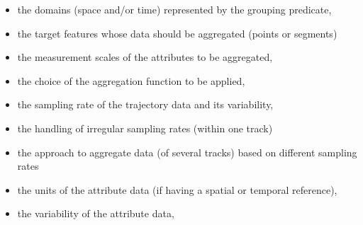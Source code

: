 \documentclass[12pt, oneside, a4paper]{scrbook}
\begin{document}
\begin{itemize}
\item the domains (space and/or time) represented by the grouping predicate, %
\item the target features whose data should be aggregated (points or segments) 
\item the measurement scales of the attributes to be aggregated, %
\item the choice of the aggregation function to be applied, 
\item the sampling rate of the trajectory data and its variability, 
\item the handling of irregular sampling rates (within one track) %
\item the approach to aggregate data (of several tracks) based on different sampling rates
\item the units of the attribute data (if having a spatial or temporal reference),  %
\item the variability of the attribute data,
\end{itemize}




\par\medskip


\end{document}
